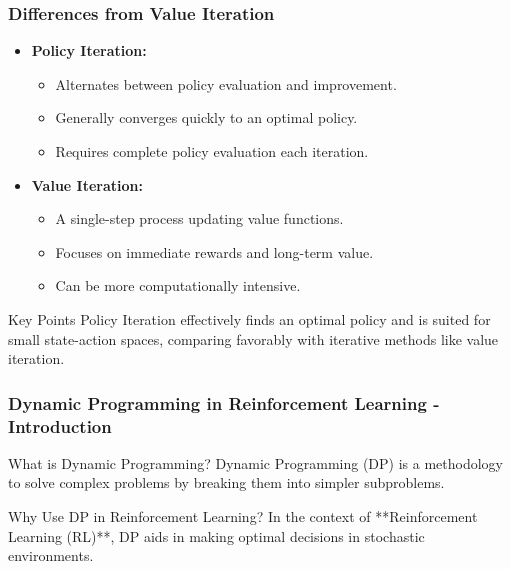 \documentclass[aspectratio=169]{beamer}
\begin{document}
\begin{frame}[fragile]
    \frametitle{Differences from Value Iteration}
    \begin{itemize}
        \item \textbf{Policy Iteration:}
        \begin{itemize}
            \item Alternates between policy evaluation and improvement.
            \item Generally converges quickly to an optimal policy.
            \item Requires complete policy evaluation each iteration.
        \end{itemize}
        
        \item \textbf{Value Iteration:}
        \begin{itemize}
            \item A single-step process updating value functions.
            \item Focuses on immediate rewards and long-term value.
            \item Can be more computationally intensive.
        \end{itemize}
    \end{itemize}
    
    \begin{block}{Key Points}
        Policy Iteration effectively finds an optimal policy and is suited for small state-action spaces, comparing favorably with iterative methods like value iteration.
    \end{block}
\end{frame}

\begin{frame}[fragile]
  \frametitle{Dynamic Programming in Reinforcement Learning - Introduction}
  
  \begin{block}{What is Dynamic Programming?}
    Dynamic Programming (DP) is a methodology to solve complex problems by breaking them into simpler subproblems. 
  \end{block}
  
  \begin{block}{Why Use DP in Reinforcement Learning?}
    In the context of **Reinforcement Learning (RL)**, DP aids in making optimal decisions in stochastic environments.
  \end{block}
\end{frame}
\end{document}

